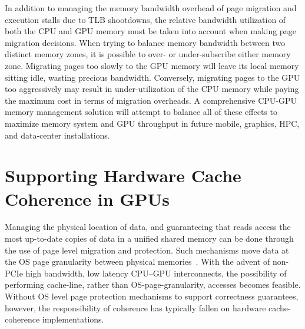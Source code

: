 In addition to managing the memory bandwidth overhead of page migration and
execution stalls due to TLB shootdowns, the relative bandwidth utilization of
both the CPU and GPU memory must be taken into account when making page
migration decisions.  When trying to balance memory bandwidth between two
distinct memory zones, it is possible to over- or under-subscribe either memory
zone. Migrating pages too slowly to the GPU memory will leave its local memory
sitting idle, wasting precious bandwidth.  Conversely, migrating pages to the
GPU too aggressively may result in under-utilization of the CPU memory while
paying the maximum cost in terms of migration overheads. A comprehensive CPU-GPU
memory management solution will attempt to balance all of these effects to
maximize memory system and GPU throughput in future mobile, graphics, HPC, and
data-center installations.

\section{Supporting Hardware Cache Coherence in GPUs}
\label{chap:background:hw-cc-is-hard}

Managing the physical location of data, and guaranteeing that reads access the
most up-to-date copies of data in a unified shared memory can be done through
the use of page level migration and protection. Such mechanisms move data at the
OS page granularity between physical memories~\cite{UVM}.  With the advent of
non-PCIe high bandwidth, low latency CPU--GPU interconnects, the possibility of
performing cache-line, rather than OS-page-granularity, accesses becomes
feasible.  Without OS level page protection mechanisms to support correctness
guarantees, however,  the responsibility of coherence has typically fallen on
hardware cache-coherence implementations.

